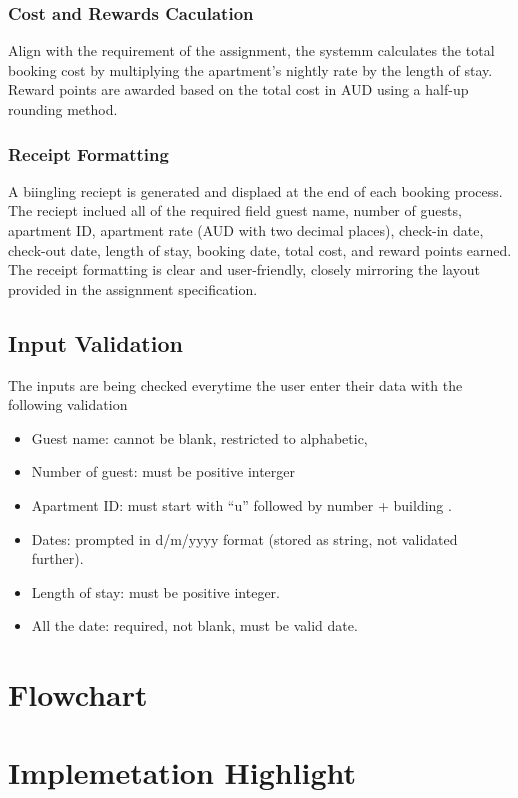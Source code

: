 \documentclass[conference]{IEEEtran}
\begin{document}
\subsubsection{Cost and Rewards Caculation}
Align with the requirement of the assignment, the systemm calculates the total booking cost by multiplying the apartment's nightly rate by the length of stay. Reward points are awarded based on the total cost in AUD using a half-up rounding method.
\subsubsection{Receipt Formatting}
A biingling reciept is generated and displaed at the end of each booking process. The reciept inclued all of the required field  guest name, number of guests, apartment ID, apartment rate (AUD with two decimal places), check-in date, check-out date, length of stay, booking date, total cost, and reward points earned. The receipt formatting is clear and user-friendly, closely mirroring the layout provided in the assignment specification.

\subsection{Input Validation}
The inputs are being checked everytime the user enter their data with the following validation 
\begin{itemize}
    \item Guest name: cannot be blank, restricted to alphabetic,
    \item Number of guest: must be positive interger
    \item Apartment ID: must start with “u” followed by number + building .
    \item Dates: prompted in d/m/yyyy format (stored as string, not validated further).
    \item Length of stay: must be positive integer.
    \item All the date: required, not blank, must be valid date.
\end{itemize}

\section{Flowchart}

\section{Implemetation Highlight}
\end{document}
